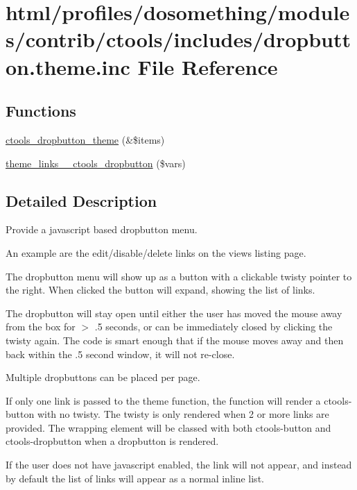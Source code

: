 \hypertarget{dropbutton_8theme_8inc}{
\section{html/profiles/dosomething/modules/contrib/ctools/includes/dropbutton.theme.inc File Reference}
\label{dropbutton_8theme_8inc}
}
\subsection*{Functions}
\begin{DoxyCompactItemize}
\item 
\hyperlink{dropbutton_8theme_8inc_a99047f738264a4430be947b0405f6334}{ctools\_\-dropbutton\_\-theme} (\&\$items)
\item 
\hyperlink{dropbutton_8theme_8inc_a17b29f655247ef7a2a5925a4963e7a6f}{theme\_\-links\_\-\_\-ctools\_\-dropbutton} (\$vars)
\end{DoxyCompactItemize}


\subsection{Detailed Description}
Provide a javascript based dropbutton menu.

An example are the edit/disable/delete links on the views listing page.

The dropbutton menu will show up as a button with a clickable twisty pointer to the right. When clicked the button will expand, showing the list of links.

The dropbutton will stay open until either the user has moved the mouse away from the box for $>$ .5 seconds, or can be immediately closed by clicking the twisty again. The code is smart enough that if the mouse moves away and then back within the .5 second window, it will not re-\/close.

Multiple dropbuttons can be placed per page.

If only one link is passed to the theme function, the function will render a ctools-\/button with no twisty. The twisty is only rendered when 2 or more links are provided. The wrapping element will be classed with both ctools-\/button and ctools-\/dropbutton when a dropbutton is rendered.

If the user does not have javascript enabled, the link will not appear, and instead by default the list of links will appear as a normal inline list.

